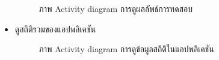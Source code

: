 \documentclass[12pt,oneside,openright,a4paper]{cpe-thai-project}
\begin{document}
\begin{itemize}
\begin{figure}[!ht]
      \caption{ภาพ Activity diagram การดูผลลัพธ์การทดสอบ}\label{fig:activity2}
     \end{figure}
     \newpage
    \item ดูสถิติรวมของแอปพลิเคชัน
    \begin{figure}[!ht]\centering
      \setlength{\fboxrule}{0.2mm} %
      \setlength{\fboxsep}{1cm}
      \caption{ภาพ Activity diagram การดูข้อมูลสถิติในแอปพลิเคชัน}\label{fig:activity3}
     \end{figure}
  \end{itemize}
\end{document}
